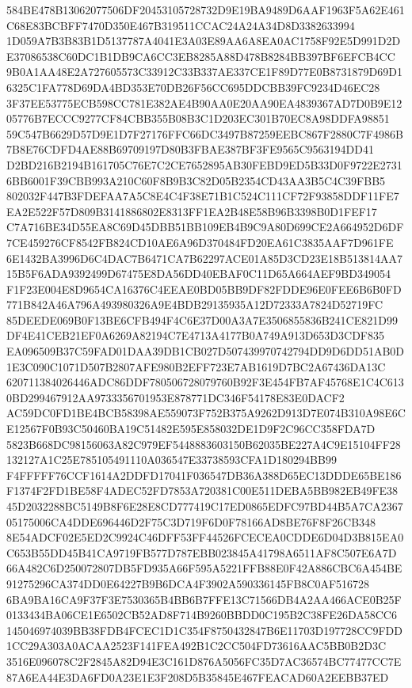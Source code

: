 \documentclass[UTF8,fontset=fandol,zihao=-4,a4paper]{ctexart}
\begin{document}
{{584BE478B13062077506DF20453105728732D9E19BA9489D6AAF1963F5A62E461C68E83BCBFF7470D350E467B319511CCAC24A24A34D8D3382633994
1D059A7B3B83B1D5137787A4041E3A03E89AA6A8EA0AC1758F92E5D991D2DE37086538C60DC1B1DB9CA6CC3EB8285A88D478B8284BB397BF6EFCB4CC
9B0A1AA48E2A727605573C33912C33B337AE337CE1F89D77E0B8731879D69D16325C1FA778D69DA4BD353E70DB26F56CC695DDCBB39FC9234D46EC28
3F37EE53775ECB598CC781E382AE4B90AA0E20AA90EA4839367AD7D0B9E1205776B7ECCC9277CF84CBB355B08B3C1D203EC301B70EC8A98DDFA98851
59C547B6629D57D9E1D7F27176FFC66DC3497B87259EEBC867F2880C7F4986B7B8E76CDFD4AE88B69709197D80B3FBAE387BF3FE9565C9563194DD41
D2BD216B2194B161705C76E7C2CE7652895AB30FEBD9ED5B33D0F9722E27316BB6001F39CBB993A210C60F8B9B3C82D05B2354CD43AA3B5C4C39FBB5
802032F447B3FDEFAA7A5C8E4C4F38E71B1C524C111CF72F93858DDF11FE7EA2E522F57D809B3141886802E8313FF1EA2B48E58B96B3398B0D1FEF17
C7A716BE34D55EA8C69D45DBB51BB109EB4B9C9A80D699CE2A664952D6DF7CE459276CF8542FB824CD10AE6A96D370484FD20EA61C3835AAF7D961FE
6E1432BA3996D6C4DAC7B6471CA7B62297ACE01A85D3CD23E18B513814AA715B5F6ADA9392499D67475E8DA56DD40EBAF0C11D65A664AEF9BD349054
F1F23E004E8D9654CA16376C4EEAE0BD05BB9DF82FDDE96E0FEE6B6B0FD771B842A46A796A493980326A9E4BDB29135935A12D72333A7824D52719FC
85DEEDE069B0F13BE6CFB494F4C6E37D00A3A7E3506855836B241CE821D99DF4E41CEB21EF0A6269A82194C7E4713A4177B0A749A913D653D3CDF835
EA096509B37C59FAD01DAA39DB1CB027D507439970742794DD9D6DD51AB0D1E3C090C1071D507B2807AFE980B2EFF723E7AB1619D7BC2A67436DA13C
620711384026446ADC86DDF780506728079760B92F3E454FB7AF45768E1C4C6130BD299467912AA9733356701953E878771DC346F54178E83E0DACF2
AC59DC0FD1BE4BCB58398AE559073F752B375A9262D913D7E074B310A98E6CE12567F0B93C50460BA19C51482E595E858032DE1D9F2C96CC358FDA7D
5823B668DC98156063A82C979EF5448883603150B62035BE227A4C9E15104FF28132127A1C25E785105491110A036547E33738593CFA1D180294BB99
F4FFFFF76CCF1614A2DDFD17041F036547DB36A388D65EC13DDDE65BE186F1374F2FD1BE58F4ADEC52FD7853A720381C00E511DEBA5BB982EB49FE38
45D2032288BC5149B8F6E28E8CD777419C17ED0865EDFC97BD44B5A7CA236705175006CA4DDE696446D2F75C3D719F6D0F78166AD8BE76F8F26CB348
8E54ADCF02E5ED2C9924C46DFF53FF44526FCECEA0CDDE6D04D3B815EA0C653B55DD45B41CA9719FB577D787EBB023845A41798A6511AF8C507E6A7D
66A482C6D250072807DB5FD935A66F595A5221FFB88E0F42A886CBC6A454BE91275296CA374DD0E64227B9B6DCA4F3902A590336145FB8C0AF516728
6BA9BA16CA9F37F3E7530365B4BB6B7FFE13C71566DB4A2AA466ACE0B25F0133434BA06CE1E6502CB52AD8F714B9260BBDD0C195B2C38FE26DA58CC6
145046974039BB38FDB4FCEC1D1C354F8750432847B6E11703D197728CC9FDD1CC29A303A0ACAA2523F141FEA492B1C2CC504FD73616AAC5BB0B2D3C
3516E096078C2F2845A82D94E3C161D876A5056FC35D7AC36574BC77477CC7E87A6EA44E3DA6FD0A23E1E3F208D5B35845E467FEACAD60A2EEBB37ED
}}
\end{document}
